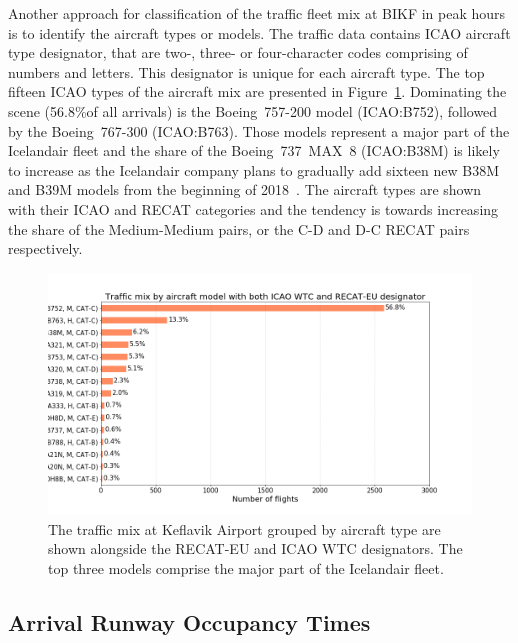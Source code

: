 Another approach for classification of the traffic fleet mix at BIKF in peak hours is to identify the aircraft types or models. The traffic data contains ICAO aircraft type designator, that are two-, three- or four-character codes comprising of numbers and letters. This designator is unique for each aircraft type. The top fifteen ICAO types of the aircraft mix are presented in Figure~\ref{fig:traffic_mix_by_model}. Dominating the scene (56.8\%of all arrivals) is the Boeing~757-200 model (ICAO:B752), followed by the Boeing~767-300 (ICAO:B763). Those models represent a major part of the Icelandair fleet and the share of the Boeing~737~MAX~8 (ICAO:B38M) is likely to increase as the Icelandair company plans to gradually add sixteen new B38M and B39M models from the beginning of 2018~\cite{icelandair_fleet}. The aircraft types are shown with their ICAO and RECAT categories and the tendency is towards increasing the share of the Medium-Medium pairs, or the C-D and D-C RECAT pairs respectively.

\begin{figure}[h]
    \centering
    \includegraphics[width=1\textwidth]{graphics/fig_traffic_mix_by_model.png}
    \caption[Traffic mix by aircraft model.]{The traffic mix at Keflavik Airport grouped by aircraft type are shown alongside the RECAT-EU and ICAO WTC designators. The top three models comprise the major part of the Icelandair fleet.}
    \label{fig:traffic_mix_by_model}
\end{figure}



\subsection{Arrival Runway Occupancy Times}

